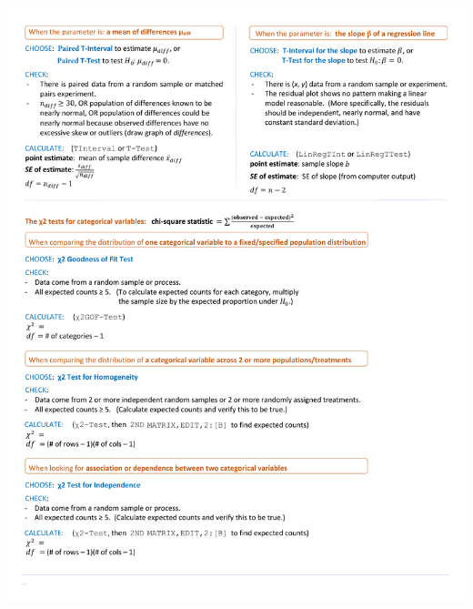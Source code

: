 \begin{center}
\includegraphics[height=9.3in]{extraTeX/inferenceGuide/figures/inference_guide2}
\end{center}
\label{inferenceGuide}
\restoregeometry
